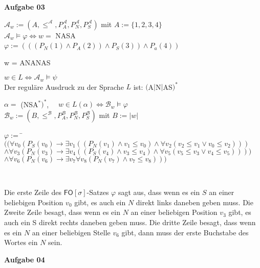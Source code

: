 \documentclass[a4paper,10pt]{article}
\begin{document}
	\textbf{Aufgabe 03}
	\begin{compactenum} [(a)]
		\item $ \mathcal{A}_w := (A, \leq^\mathcal{A}, P_A^\mathcal{A}, P_N^\mathcal{A}, P_S^\mathcal{A}) $ mit $ A:= \{1,2,3,4\} $\\
		$ \mathcal{A}_w \models \varphi \Longleftrightarrow  w =$ NASA  \\
		$ \varphi := (((P_N(1)\wedge P_A(2)) \wedge P_S(3)) \wedge P_a(4))$ \ \\
		\item w = ANANAS \ \\
		\item $ w \in L \Longleftrightarrow \mathcal{A}_w \models \psi $ \\
		Der reguläre Ausdruck zu der Sprache $ L $ ist: $ ($A$|$N$|$AS$)^*$ \ \\
		\item $ \alpha = $ (NSA$^*)^*$, $ \quad w \in L(\alpha)  \Longleftrightarrow \mathcal{B}_w \models \varphi$\\
		$ \mathcal{B}_w := (B, \leq^\mathcal{B}, P_A^\mathcal{B}, P_N^\mathcal{B}, P_S^\mathcal{B}) $ mit $ B:=|w| $ \\
		\begin{tabbing}
			$ \varphi := $ \=$ ((\forall v_0 (P_S(v_0)\rightarrow \exists v_1((P_N(v_1)\wedge v_1 \leq v_0) \wedge \forall v_2(v_2 \leq v_1 \vee v_0 \leq v_2 ))) $\\
			\> $ \wedge \forall v_3 (P_N(v_3)\rightarrow \exists v_4((P_S(v_4)\wedge v_3 \leq v_4) \wedge \forall v_5(v_5 \leq v_3 \vee v_4 \leq v_5 )))) $\\ 
			\> $ \wedge \forall v_6(P_N(v_6)\rightarrow \exists v_7\forall v_8(P_N(v_7)\wedge v_7 \leq v_8))) $
		\end{tabbing} \
		
		Die erste Zeile des $\mathsf{FO}[\sigma]$-Satzes $ \varphi $ sagt aus, dass wenn es ein $S$ an einer beliebigen Position $ v_0 $ gibt, es auch ein $N$ direkt links daneben geben muss. Die Zweite Zeile besagt, dass wenn es ein $N$ an einer beliebigen Position $ v_3 $ gibt, es auch ein S direkt rechts daneben geben muss. Die dritte Zeile besagt, dass wenn es ein $N$ an einer beliebigen Stelle $ v_6 $ gibt, dann muss der erste Buchstabe des Wortes ein $N$ sein. 
		
	\end{compactenum}
	\newpage
	\textbf{Aufgabe 04}
\end{document}
